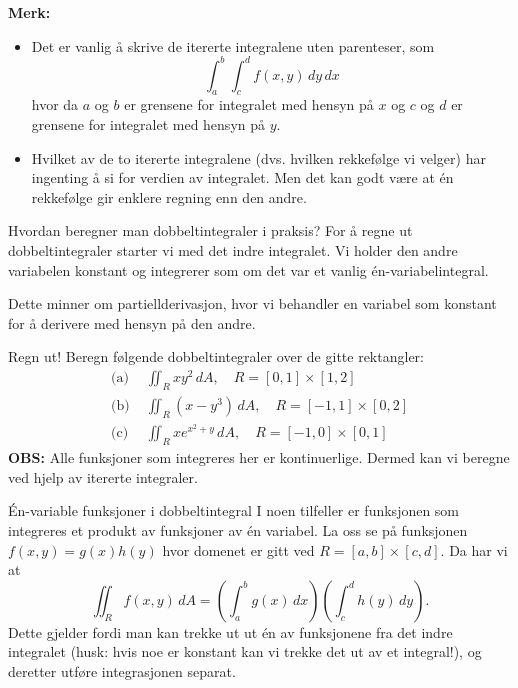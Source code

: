 \textbf{Merk:} 
\begin{itemize}
\item Det er vanlig å skrive de itererte integralene uten parenteser, som
$$\int_a^b \int_c^d f(x, y) \, dy  \, dx$$
hvor da $a$ og $b$ er grensene for integralet med
hensyn på $x$ og $c$ og $d$ er grensene for integralet
med hensyn på $y$.
\item 
Hvilket av de to itererte integralene (dvs. hvilken
rekkefølge vi velger) har ingenting å si for
verdien av integralet. Men det kan godt være at 
én rekkefølge gir enklere regning enn den andre. 
\end{itemize}

\begin{oppsum}{Hvordan beregner man dobbeltintegraler i praksis?}
For å regne ut dobbeltintegraler starter vi med det indre integralet. Vi holder den andre variabelen konstant og integrerer som om det var et vanlig én-variabelintegral.

Dette minner om partiellderivasjon, hvor vi behandler en variabel som konstant for å derivere med hensyn på den andre.
\end{oppsum}

\begin{eks}{Regn ut!}
Beregn følgende dobbeltintegraler over de gitte rektangler:
\begin{align*}
\text{(a) }&\iint_R xy^2 \, dA, \quad R = [0, 1] \times [1, 2]\\
\text{(b) }&\iint_R (x - y^3) \, dA, \quad R = [-1, 1] \times [0, 2]\\
\text{(c) }&\iint_R x e^{x^2 +y} \, dA, \quad R = [-1, 0] \times [0, 1]
\end{align*}
\textbf{OBS:} Alle funksjoner som integreres her er kontinuerlige. Dermed kan vi beregne ved hjelp av itererte integraler.
\end{eks}

\begin{oppsum}{Én-variable funksjoner i dobbeltintegral}
I noen tilfeller er funksjonen som integreres et produkt av funksjoner av én variabel. La oss se på funksjonen \( f(x, y) = g(x) h(y) \) hvor domenet er gitt ved \( R = [a, b] \times [c, d] \). Da har vi at
\[
\iint_R f(x, y) \, dA = \left( \int_a^b g(x) \, dx \right) \left( \int_c^d h(y) \, dy \right).
\]
Dette gjelder fordi man kan trekke ut ut én av funksjonene fra det indre integralet (husk: hvis noe er konstant kan vi trekke det ut av et integral!), og deretter utføre integrasjonen separat.
\end{oppsum}


